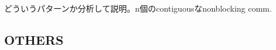 どういうパターンか分析して説明。n個のcontiguousなnonblocking comm.


\subsection{OTHERS}


\begin{figure}[tbh]
  \begin{center}
    \\

\end{center}
\end{figure}
